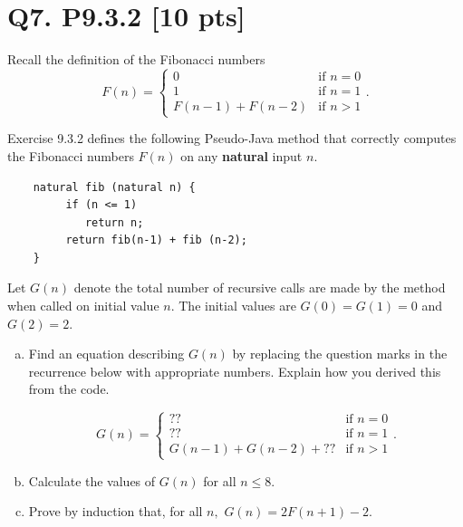 \documentclass[12pt]{article}
\begin{document}
	\newpage

	\section*{\textbf{Q7. P9.3.2} [10 pts]}

	Recall the definition of the Fibonacci numbers
	\begin{equation}
		\label{eq:9.3.2}F(n) =
		\begin{cases}
			0                   & \mbox{if $n=0$} \\
			1                   & \mbox{if $n=1$} \\
			F(n - 1) + F(n - 2) & \mbox{if $n>1$}
		\end{cases}.
	\end{equation}

	Exercise 9.3.2 defines the following Pseudo-Java method that correctly computes
	the Fibonacci numbers $F(n)$ on any {\bf natural} input $n.$

	\begin{verbatim}
    natural fib (natural n) {
         if (n <= 1) 
            return n;
         return fib(n-1) + fib (n-2);
    }
\end{verbatim}

	Let $G(n)$ denote the total number of recursive calls are made by the method when
	called on initial value $n$. The initial values are $G(0)=G(1)=0$ and $G(2)=2$.

	\begin{enumerate}[(a)]
		\item Find an equation describing $G(n)$ by replacing the question marks in the
			recurrence below with appropriate numbers. Explain how you derived this
			from the code.

			\begin{equation}
				\label{eq:9.3.2b}G(n) =
				\begin{cases}
					??                       & \mbox{if $n=0$} \\
					??                       & \mbox{if $n=1$} \\
					G(n - 1) + G(n - 2) + ?? & \mbox{if $n>1$}
				\end{cases}.
			\end{equation}

		\item Calculate the values of $G(n)$ for all $n \le 8.$


		\item Prove by induction that, for all $n,$ $G(n) = 2F(n+1) - 2$.
	\end{enumerate}
\end{document}
